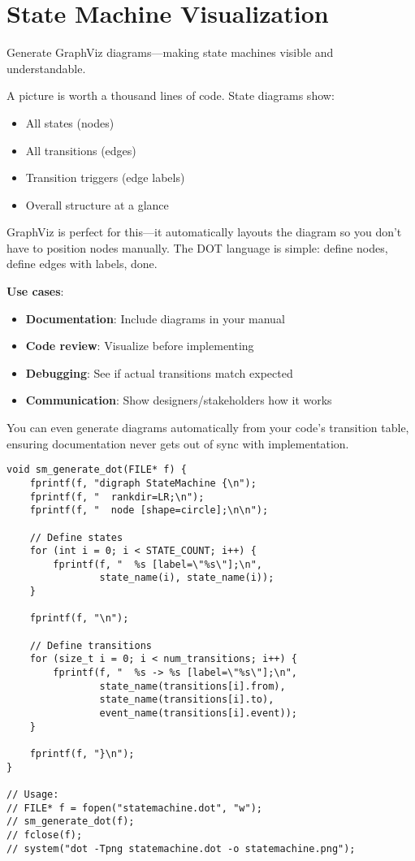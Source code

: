 \section{State Machine Visualization}

Generate GraphViz diagrams---making state machines visible and understandable.

A picture is worth a thousand lines of code. State diagrams show:
\begin{itemize}
    \item All states (nodes)
    \item All transitions (edges)
    \item Transition triggers (edge labels)
    \item Overall structure at a glance
\end{itemize}

GraphViz is perfect for this---it automatically layouts the diagram so you don't have to position nodes manually. The DOT language is simple: define nodes, define edges with labels, done.

\textbf{Use cases}:
\begin{itemize}
    \item \textbf{Documentation}: Include diagrams in your manual
    \item \textbf{Code review}: Visualize before implementing
    \item \textbf{Debugging}: See if actual transitions match expected
    \item \textbf{Communication}: Show designers/stakeholders how it works
\end{itemize}

You can even generate diagrams automatically from your code's transition table, ensuring documentation never gets out of sync with implementation.

\begin{lstlisting}
void sm_generate_dot(FILE* f) {
    fprintf(f, "digraph StateMachine {\n");
    fprintf(f, "  rankdir=LR;\n");
    fprintf(f, "  node [shape=circle];\n\n");

    // Define states
    for (int i = 0; i < STATE_COUNT; i++) {
        fprintf(f, "  %s [label=\"%s\"];\n",
                state_name(i), state_name(i));
    }

    fprintf(f, "\n");

    // Define transitions
    for (size_t i = 0; i < num_transitions; i++) {
        fprintf(f, "  %s -> %s [label=\"%s\"];\n",
                state_name(transitions[i].from),
                state_name(transitions[i].to),
                event_name(transitions[i].event));
    }

    fprintf(f, "}\n");
}

// Usage:
// FILE* f = fopen("statemachine.dot", "w");
// sm_generate_dot(f);
// fclose(f);
// system("dot -Tpng statemachine.dot -o statemachine.png");
\end{lstlisting}

